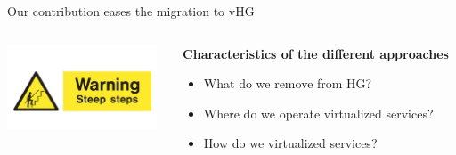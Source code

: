 \documentclass[a4paper]{beamer}
\begin{document}
\begin{frame}{Our contribution eases the migration to vHG}
		\begin{columns}[T]
		\begin{column}[T]{0.33 \textwidth} 
									
			\includegraphics[width=12em]{loco.png}
		\end{column}
						
		\begin{column}[T]{0.66\textwidth} 
				   
					\textbf{Characteristics of the different approaches}
					\begin{itemize}
						\item What do we remove from HG?
						\item Where do we operate virtualized services?
						\item How do we virtualized services?
					\end{itemize}
			\vspace{3mm}
																																
		\end{column}
																						
	\end{columns}
\end{frame}
\end{document}
